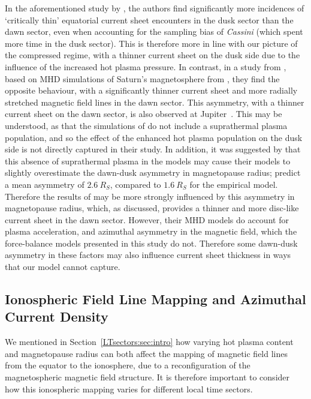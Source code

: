 In the aforementioned study by \citet{delamere2015}, the authors find significantly more incidences of `critically thin' equatorial current sheet encounters in the dusk sector than the dawn sector, even when accounting for the sampling bias of \textit{Cassini} (which spent more time in the dusk sector). This is therefore more in line with our picture of the compressed regime, with a thinner current sheet on the dusk side due to the influence of the increased hot plasma pressure. In contrast, in a study from \citet{jia2016}, based on MHD simulations of Saturn's magnetosphere from \citet{jia2012b}, they find the opposite behaviour, with a significantly thinner current sheet and more radially stretched magnetic field lines in the dawn sector. This asymmetry, with a thinner current sheet on the dawn sector, is also observed at Jupiter~\citep[e.g.][]{khurana2004}. This may be understood, as that the simulations of \citet{jia2012b} do not include a suprathermal plasma population, and so the effect of the enhanced hot plasma population on the dusk side is not directly captured in their study. In addition, it was suggested by \citet{pilkington2015b} that this absence of suprathermal plasma in the \citet{jia2012b} models may cause their models to slightly overestimate the dawn-dusk asymmetry in magnetopause radius; \citet{jia2016} predict a mean asymmetry of $\SI{2.6}{R_S}$, compared to $\SI{1.6}{R_S}$ for the \citet{pilkington2015b} empirical model. Therefore the results of \citet{jia2016} may be more strongly influenced by this asymmetry in magnetopause radius, which, as discussed, provides a thinner and more disc-like current sheet in the dawn sector. However, their MHD models do account for plasma acceleration, and azimuthal asymmetry in the magnetic field, which the force-balance models presented in this study do not. Therefore some dawn-dusk asymmetry in these factors may also influence current sheet thickness in ways that our model cannot capture.

\subsection{Ionospheric Field Line Mapping and Azimuthal Current Density} 
We mentioned in Section~\ref{LTsectors:sec:intro} how varying hot plasma content and magnetopause radius can both affect the mapping of magnetic field lines from the equator to the ionosphere, due to a reconfiguration of the magnetospheric magnetic field structure. It is therefore important to consider how this ionospheric mapping varies for different local time sectors.

